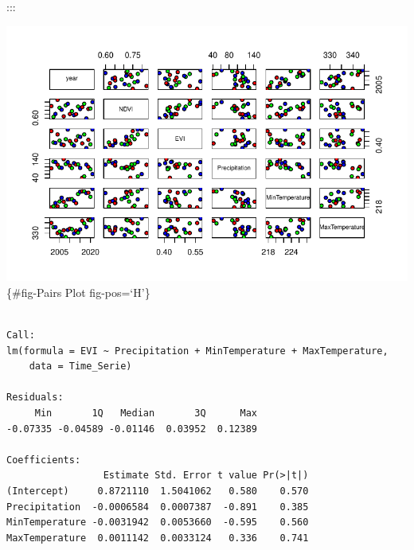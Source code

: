 \documentclass[12pt,a4paper]{book}
\begin{document}
{:::

\begin{Shaded}
\begin{Highlighting}[]
 \NormalTok{(}\NormalTok{, }\NormalTok{, }\NormalTok{),} \NormalTok{)}
\end{Highlighting}
\end{Shaded}

\includegraphics{Quarto_files/figure-pdf/fig-Pairs Plot-1.pdf}\{\#fig-Pairs
Plot fig-pos=`H'\}

\begin{Shaded}
\begin{Highlighting}[]
\NormalTok{(}\SpecialCharTok{\textasciitilde{}}\SpecialCharTok{+}\SpecialCharTok{+}
\end{Highlighting}
\end{Shaded}

\begin{verbatim}

Call:
lm(formula = EVI ~ Precipitation + MinTemperature + MaxTemperature, 
    data = Time_Serie)

Residuals:
     Min       1Q   Median       3Q      Max 
-0.07335 -0.04589 -0.01146  0.03952  0.12389 

Coefficients:
                 Estimate Std. Error t value Pr(>|t|)
(Intercept)     0.8721110  1.5041062   0.580    0.570
Precipitation  -0.0006584  0.0007387  -0.891    0.385
MinTemperature -0.0031942  0.0053660  -0.595    0.560
MaxTemperature  0.0011142  0.0033124   0.336    0.741


\end{verbatim}}
\end{document}
